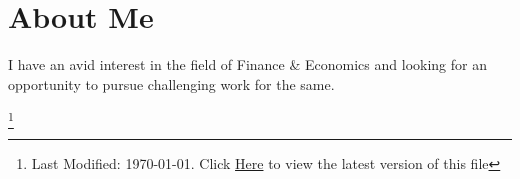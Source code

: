 \documentclass[12pt,a4paper,sans]{moderncv}
\newcommand{\Myinput}[2]{\vspace{#1}{}}
\begin{document}
 	\makecvtitle
 	\vspace{-30pt} %
 	\section{\hspace{10em} About Me}{I have an avid interest in the field of Finance \& Economics and looking for an opportunity to pursue challenging work for the same.}	 %
	
	\Myinput{-10pt}{education-content.tex}        	%
	
	\Myinput{-10pt}{experience-content.tex}        	%

	\Myinput{-10pt}{courses-content.tex}			%
	
	\Myinput{-10pt}{responsibilities-content.tex}	%
	
	\pagebreak
	 
	\Myinput{-10pt}{skill-content.tex}				%
	
	\Myinput{-10pt}{project-content.tex}			%
	
	\Myinput{-10pt}{social-content.tex}				%
	

 	\let\thefootnote\relax\footnote{Last Modified: \today. Click \href{https://docs.google.com/gview?url=https://raw.githubusercontent.com/Vallabh-Desai/Resume/edel/src/pdf/resume.pdf&embedded=true}{Here} to view the latest version of this file}
	 
 
\end{document}
